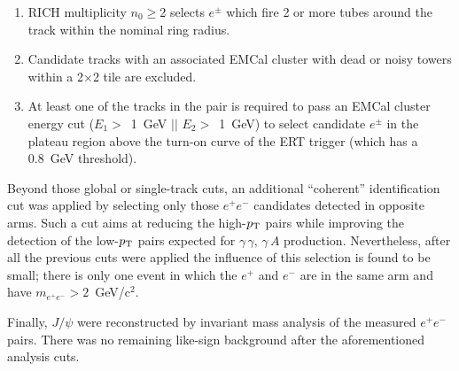 \documentclass[dvipdfm]{elsart}
\newcommand{\gaga}{\gamma\,\gamma}
\newcommand{\gA}{\gamma\,A}
\providecommand{\jpsi}{J/\psi}
\begin{document}
\begin{enumerate}

\item RICH multiplicity $n_0\geq$2 selects $e^\pm$ which fire 2 or more tubes 
around the track within the nominal ring radius.

\item Candidate tracks with an associated EMCal cluster with dead or noisy 
towers within a 2$\times$2 tile are excluded.

\item At least one of the tracks in the pair is required to pass an EMCal 
cluster energy cut ($E_1 >$~1~GeV $||$ $E_2 >$~1~GeV) to select candidate 
$e^\pm$ in the plateau region above the turn-on curve of the ERT trigger 
(which has a 0.8~GeV threshold).

\end{enumerate}

\noindent
Beyond those global or single-track cuts, an additional ``coherent'' 
identification cut was applied by selecting only those $e^+e^-$ candidates 
detected in opposite arms. Such a cut aims at reducing the high-$p_{\rm T}$ pairs 
while improving the detection of the low-$p_{\rm T}$ pairs expected for 
$\gaga,\,\gA$ production. Nevertheless, after all the previous cuts were 
applied the influence of this selection is found to be small; there is only 
one event in which the $e^+$ and $e^-$ are in the same arm and have 
$m_{e^+e^-}>2$~GeV/c$^2$.

Finally, $\jpsi$ were reconstructed by invariant mass analysis of the 
measured $e^+ e^-$ pairs. There was no remaining like-sign background after 
the aforementioned analysis cuts.
\end{document}
